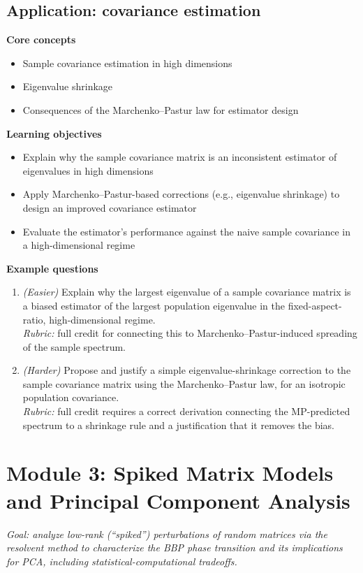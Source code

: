 \documentclass[11pt]{article}
\begin{document}
\subsection{Application: covariance estimation}
\textbf{Core concepts}
\begin{itemize}[nosep]
\item Sample covariance estimation in high dimensions
\item Eigenvalue shrinkage
\item Consequences of the Marchenko--Pastur law for estimator design
\end{itemize}
\textbf{Learning objectives}
\begin{itemize}[nosep]
\item Explain why the sample covariance matrix is an inconsistent estimator of eigenvalues in high dimensions
\item Apply Marchenko--Pastur-based corrections (e.g., eigenvalue shrinkage) to design an improved covariance estimator
\item Evaluate the estimator's performance against the naive sample covariance in a high-dimensional regime
\end{itemize}
\textbf{Example questions}
\begin{enumerate}[nosep]
\item \emph{(Easier)} Explain why the largest eigenvalue of a sample covariance matrix is a biased estimator of the largest population eigenvalue in the fixed-aspect-ratio, high-dimensional regime. \\
\emph{Rubric:} full credit for connecting this to Marchenko--Pastur-induced spreading of the sample spectrum.
\item \emph{(Harder)} Propose and justify a simple eigenvalue-shrinkage correction to the sample covariance matrix using the Marchenko--Pastur law, for an isotropic population covariance. \\
\emph{Rubric:} full credit requires a correct derivation connecting the MP-predicted spectrum to a shrinkage rule and a justification that it removes the bias.
\end{enumerate}

\section{Module 3: Spiked Matrix Models and Principal Component Analysis}
\emph{Goal: analyze low-rank (``spiked'') perturbations of random matrices via the resolvent method to characterize the BBP phase transition and its implications for PCA, including statistical-computational tradeoffs.}
\end{document}
